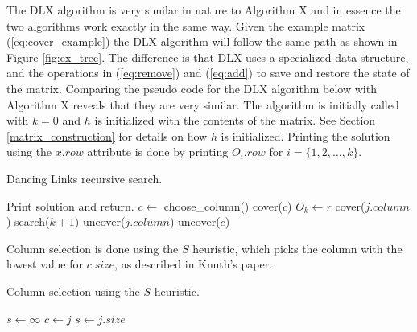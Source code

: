 The DLX algorithm is very similar in nature to Algorithm X and in essence the two algorithms work exactly in the same way.
Given the example matrix (\ref{eq:cover_example}) the DLX algorithm will follow the same path as shown in Figure \ref{fig:ex_tree}.
The difference is that DLX uses a specialized data structure, and the operations in (\ref{eq:remove}) and (\ref{eq:add}) to save and restore the state of the matrix.
Comparing the pseudo code for the DLX algorithm below with Algorithm X reveals that they are very similar.
The algorithm is initially called with $k = 0$ and $h$ is initialized with the contents of the matrix.
See Section \ref{matrix_construction} for details on how $h$ is initialized.
Printing the solution using the $x.row$ attribute is done by printing $O_{i}.row$ for $i = \{1, 2, \ldots, k\}$.
\begin{algorithm}[H]
	\caption{Dancing Links recursive search.}
	\label{dlx_search}
	\begin{distribalgo}[1]
				\STATE Print solution and return.  
			\ENDIF
			\STATE $c \leftarrow$ choose\_column()
			\STATE cover($c$)
				\STATE $O_k \leftarrow r$  
					\STATE cover($j.column$)
				\ENDFOR
				\STATE search($k + 1$)
					\STATE uncover($j.column$)
				\ENDFOR
			\ENDFOR
			\STATE uncover($c$)
		\ENDPROC
	\end{distribalgo}
\end{algorithm}

Column selection is done using the $S$ heuristic, which picks the column with the lowest value for $c.size$, as described in Knuth's paper.
\begin{algorithm}[H]
	\caption{Column selection using the $S$ heuristic.}
	\label{dlx_column}
	\begin{distribalgo}[1]
			\STATE $s \leftarrow \infty$
					\STATE $c \leftarrow j$
					\STATE $s \leftarrow j.size$
				\ENDIF
			\ENDFOR
		\ENDFUNC
	\end{distribalgo}
\end{algorithm}

